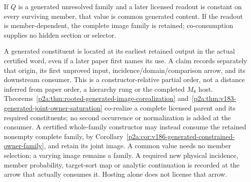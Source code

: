 \documentclass[12pt,a4paper]{article}
\begin{document}
\begin{corollary}
\label{p2a:cor:v3101-coconsumed-family-readout}
If $Q$ is a generated unresolved family and a later licensed readout is
constant on every surviving member, that value is common generated content.
If the readout is member-dependent, the complete image family is retained;
co-consumption supplies no hidden section or selector.
\end{corollary}
\begin{remark}
\label{p2a:rem:constructor-origin-and-consumer}
A generated constituent is located at its earliest retained output in the
actual certified word, even if a later paper first names its use.
A claim records separately that origin, its first unproved input,
incidence/domain/comparison arrow, and its downstream consumer.
This is a constructor-relative partial order, not a distance inferred from
paper order, a hierarchy rung or the completed \(M_8\) host.
Theorems~\ref{p2a:thm:rooted-generated-image-corealization}
and~\ref{p2a:thm:v183-generated-joint-owner-saturation} co-realize a complete
licensed parent and its required constituents; no second occurrence or
normalization is added at the consumer.
A certified whole-family constructor may instead consume the retained
nonempty complete family, by
Corollary~\ref{p2a:cor:v186-generated-constrained-owner-family}, and retain its
joint image.  A common value needs no member selection; a varying image
remains a family.  A required new physical incidence, member probability,
target-sort map or analytic continuation is recorded at the arrow that
actually consumes it.  Hosting alone does not license that arrow.
\end{remark}
\end{document}
